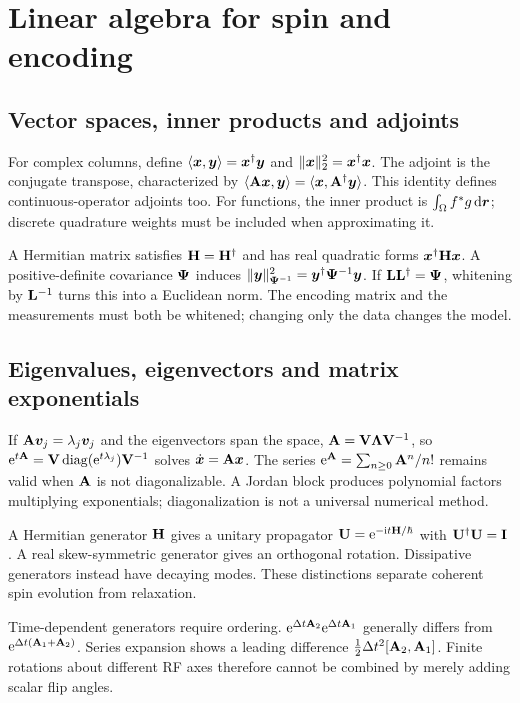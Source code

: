 \section{Linear algebra for spin and encoding}
\label{sec:01:linear-algebra-for-spin-and-encoding}
\subsection{Vector spaces, inner products and adjoints}
For complex columns, define
$\langle\bm{x},\bm{y}\rangle=\bm{x}^{\dagger}\bm{y}$ and
$\lVert\bm{x}\rVert_2^2=\bm{x}^{\dagger}\bm{x}$. The adjoint is the
conjugate transpose, characterized by
$\langle\mathbf{A}\bm{x},\bm{y}\rangle
=\langle\bm{x},\mathbf{A}^{\dagger}\bm{y}\rangle$.
This identity defines continuous-operator adjoints too. For functions,
the inner product is $\int_\Omega f^*g\mathop{}\!\mathrm{d}\bm{r}$;
discrete quadrature weights must be included when approximating it.

A Hermitian matrix satisfies $\mathbf{H}=\mathbf{H}^{\dagger}$ and has real quadratic
forms $\bm{x}^{\dagger}\mathbf{H}\bm{x}$. A positive-definite covariance
$\mathbf{\Psi}$ induces
$\lVert\bm{y}\rVert_{\mathbf{\Psi}^{-1}}^2=\bm{y}^{\dagger}\mathbf{\Psi}^{-1}\bm{y}$.
If $\mathbf{L}\mathbf{L}^{\dagger}=\mathbf{\Psi}$, whitening by $\mathbf{L}^{-1}$ turns
this into a Euclidean norm. The encoding matrix and the measurements
must both be whitened; changing only the data changes the model.

\subsection{Eigenvalues, eigenvectors and matrix exponentials}
If $\mathbf{A}\bm{v}_j=\lambda_j\bm{v}_j$ and the eigenvectors span the space,
$\mathbf{A}=\mathbf{V}\mathbf{\Lambda}\mathbf{V}^{-1}$, so
$\mathrm{e}^{t\mathbf{A}}=\mathbf{V}\operatorname{diag}(\mathrm{e}^{t\lambda_j})\mathbf{V}^{-1}$ solves
$\dot{\bm{x}}=\mathbf{A}\bm{x}$.
The series $\mathrm{e}^{\mathbf{A}}=\sum_{n\geq0}\mathbf{A}^n/n!$ remains valid
when $\mathbf{A}$ is not diagonalizable. A Jordan block produces polynomial
factors multiplying exponentials; diagonalization is not a universal
numerical method.

A Hermitian generator $\mathbf{H}$ gives a unitary propagator
$\mathbf{U}=\mathrm{e}^{-\mathrm{i} t\mathbf{H}/\hbar}$ with $\mathbf{U}^{\dagger}\mathbf{U}=\mathbf{I}$.
A real skew-symmetric generator gives an orthogonal rotation.
Dissipative generators instead have decaying modes. These distinctions
separate coherent spin evolution from relaxation.

Time-dependent generators require ordering.
$\mathrm{e}^{\Delta t\mathbf{A}_2}\mathrm{e}^{\Delta t\mathbf{A}_1}$ generally differs from
$\mathrm{e}^{\Delta t(\mathbf{A}_1+\mathbf{A}_2)}$.
Series expansion shows a leading difference
$\tfrac12\Delta t^2[\mathbf{A}_2,\mathbf{A}_1]$.
Finite rotations about different RF axes therefore cannot be combined
by merely adding scalar flip angles.

